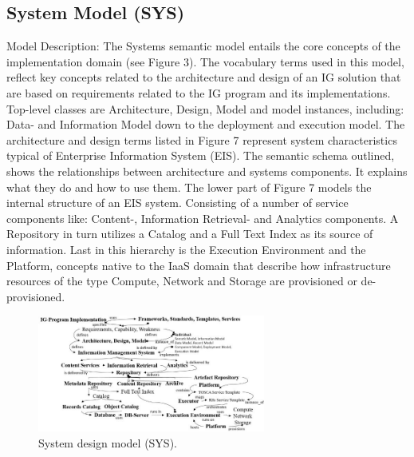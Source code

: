 \subsection{System Model (SYS)}
Model Description: The Systems semantic model entails the core concepts of the implementation domain (see Figure 3). The vocabulary terms used in this model, reflect key concepts related to the architecture and design of an IG solution that are based on requirements related to the IG program and its implementations. Top-level classes are Architecture, Design, Model and model instances, including: Data- and Information Model down to the deployment and execution model.
 The architecture and design terms listed in Figure 7 represent system characteristics typical of Enterprise Information System (EIS). The semantic schema outlined, shows the relationships between architecture and systems components. It explains what they do and how to use them. The lower part of Figure 7 models the internal structure of an EIS system. Consisting of a number of service components like: Content-, Information Retrieval- and Analytics components. A Repository in turn utilizes a Catalog and a Full Text Index as its source of information. Last in this hierarchy is the Execution Environment and the Platform, concepts native to the IaaS domain that describe how infrastructure resources of the type Compute, Network and Storage are provisioned or de-provisioned.
%
\begin{figure}[h]
  \centering
    \includegraphics[width=7.5cm]{images/Fig7-IG.sys.Model.png}
    \caption{System design model (SYS).}
  \label{fig:sysmod}
\end{figure}
